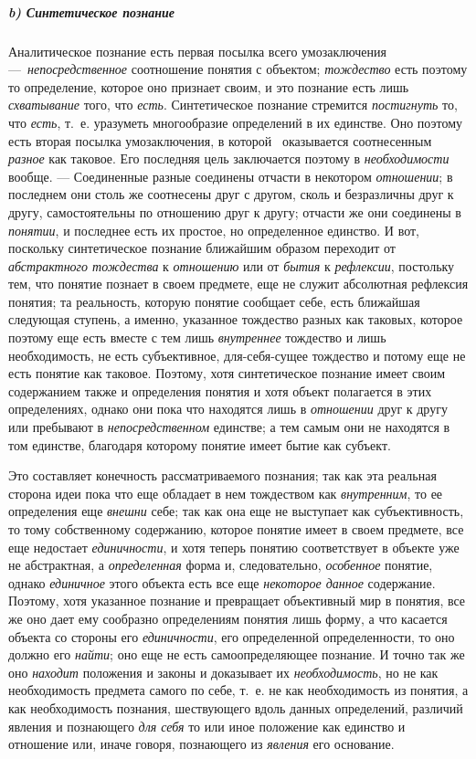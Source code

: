 \documentclass[twoside]{article}
\begin{document}
{\subparagraph[b) Синтетическое познание]{b) Синтетическое познание}
Аналитическое познание есть первая посылка всего
умозаключения —~{\em непосредственное}
соотношение понятия с объектом;
{\em тождество} есть
поэтому то определение, которое оно признает своим, и это познание есть
лишь {\em схватывание}
того, что {\em есть}.
Синтетическое познание стремится
{\em постигнуть} то, что
{\em есть}, т.~е.
уразуметь многообразие определений в их единстве. Оно поэтому есть вторая
посылка умозаключения, в
которой~\label{bkm:bm105}
оказывается соотнесенным
{\em разное} как таковое.
Его последняя цель заключается поэтому в
{\em необходимости}
вообще. — Соединенные разные соединены отчасти
в некотором {\em отношении};
в последнем они столь же соотнесены друг с другом, сколь и
безразличны друг к другу, самостоятельны по отношению друг к другу; отчасти
же они соединены в {\em понятии},
и последнее есть их простое, но определенное единство. И вот,
поскольку синтетическое познание ближайшим образом переходит от
{\em абстрактного тождества}
к {\em отношению}
или от {\em бытия}
к {\em рефлексии},
постольку тем, что понятие познает в своем предмете, еще не
служит абсолютная рефлексия понятия; та реальность, которую понятие
сообщает себе, есть ближайшая следующая ступень, а именно, указанное
тождество разных как таковых, которое поэтому еще есть вместе с тем лишь
{\em внутреннее}
тождество и лишь необходимость, не есть субъективное,
для-себя-сущее тождество и потому еще не есть понятие как таковое. Поэтому,
хотя синтетическое познание имеет своим содержанием также и определения
понятия и хотя объект полагается в этих определениях, однако они пока что
находятся лишь в {\em отношении}
друг к другу или пребывают в
{\em непосредственном}
единстве; а тем самым они не находятся в том единстве,
благодаря которому понятие имеет бытие как субъект.

Это составляет конечность рассматриваемого познания; так как
эта реальная сторона идеи пока что еще обладает в нем тождеством как
{\em внутренним}, то ее
определения еще {\em внешни}
себе; так как она еще не выступает как субъективность, то
тому собственному содержанию, которое понятие имеет в своем предмете, все
еще недостает {\em единичности},
и хотя теперь понятию соответствует в объекте уже не
абстрактная, а {\em определенная}
форма и, следовательно,
{\em особенное} понятие,
однако {\em единичное}
этого объекта есть все еще
{\em некоторое данное}
содержание. Поэтому, хотя указанное познание и превращает
объективный мир в понятия, все же оно дает ему сообразно
определениям понятия лишь форму, а что касается объекта со стороны его
{\em единичности}, его
определенной определенности, то оно должно его
{\em найти}; оно еще не
есть самоопределяющее познание. И точно так же оно
{\em находит} положения и
законы и доказывает их
{\em необходимость}, но
не как необходимость предмета самого по себе, т.~е. не как необходимость из
понятия, а как необходимость познания, шествующего вдоль данных
определений, различий явления и познающего
{\em для себя} то или
иное положение как единство и отношение или, иначе говоря, познающего из
{\em явления} его
основание.

}
\end{document}

